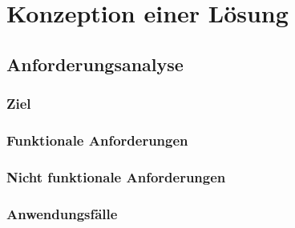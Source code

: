 \chapter{Konzeption einer Lösung}

\section{Anforderungsanalyse}
\subsection{Ziel}
\subsection{Funktionale Anforderungen}
\subsection{Nicht funktionale Anforderungen}
\subsection{Anwendungsfälle}